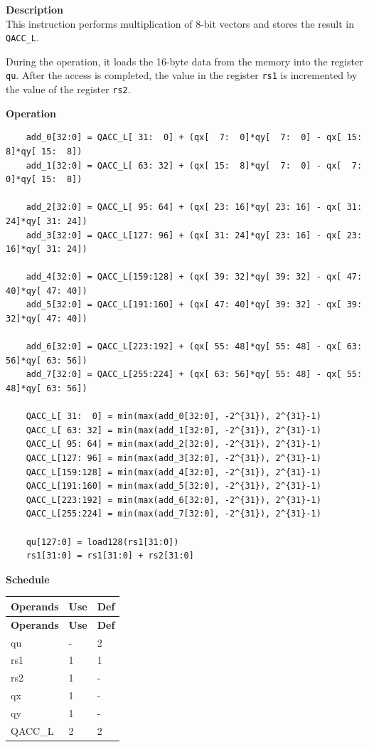 \textbf{Description}\\
This instruction performs multiplication of 8-bit vectors and stores the result in \lstinline{QACC_L}.

During the operation, it loads the 16-byte data from the memory into the register \lstinline{qu}. After the access is completed, the value in the register \lstinline{rs1} is incremented by the value of the register \lstinline{rs2}.


\textbf{Operation}\\
\begin{lstlisting}
    add_0[32:0] = QACC_L[ 31:  0] + (qx[  7:  0]*qy[  7:  0] - qx[ 15:  8]*qy[ 15:  8])
    add_1[32:0] = QACC_L[ 63: 32] + (qx[ 15:  8]*qy[  7:  0] - qx[  7:  0]*qy[ 15:  8])

    add_2[32:0] = QACC_L[ 95: 64] + (qx[ 23: 16]*qy[ 23: 16] - qx[ 31: 24]*qy[ 31: 24])
    add_3[32:0] = QACC_L[127: 96] + (qx[ 31: 24]*qy[ 23: 16] - qx[ 23: 16]*qy[ 31: 24])

    add_4[32:0] = QACC_L[159:128] + (qx[ 39: 32]*qy[ 39: 32] - qx[ 47: 40]*qy[ 47: 40])
    add_5[32:0] = QACC_L[191:160] + (qx[ 47: 40]*qy[ 39: 32] - qx[ 39: 32]*qy[ 47: 40])

    add_6[32:0] = QACC_L[223:192] + (qx[ 55: 48]*qy[ 55: 48] - qx[ 63: 56]*qy[ 63: 56])
    add_7[32:0] = QACC_L[255:224] + (qx[ 63: 56]*qy[ 55: 48] - qx[ 55: 48]*qy[ 63: 56])

    QACC_L[ 31:  0] = min(max(add_0[32:0], -2^{31}), 2^{31}-1)
    QACC_L[ 63: 32] = min(max(add_1[32:0], -2^{31}), 2^{31}-1)
    QACC_L[ 95: 64] = min(max(add_2[32:0], -2^{31}), 2^{31}-1)
    QACC_L[127: 96] = min(max(add_3[32:0], -2^{31}), 2^{31}-1)
    QACC_L[159:128] = min(max(add_4[32:0], -2^{31}), 2^{31}-1)
    QACC_L[191:160] = min(max(add_5[32:0], -2^{31}), 2^{31}-1)
    QACC_L[223:192] = min(max(add_6[32:0], -2^{31}), 2^{31}-1)
    QACC_L[255:224] = min(max(add_7[32:0], -2^{31}), 2^{31}-1)

    qu[127:0] = load128(rs1[31:0])
    rs1[31:0] = rs1[31:0] + rs2[31:0]
\end{lstlisting}

\textbf{Schedule}\\
\begin{longtable}[c]{|l|l|l|}
    \hline
    \rowcolor{lightgray}
    \textbf{Operands} & \textbf{Use} & \textbf{Def} \\\hline
    \endfirsthead
    \hline
    \rowcolor{lightgray}
     \textbf{Operands} & \textbf{Use} & \textbf{Def} \\\hline
    \endhead
    \hline
    \endfoot

    qu & - & 2 \\\hline
    rs1 & 1 & 1 \\\hline
    rs2 & 1 & - \\\hline
     qx & 1 & - \\\hline
     qy & 1 & - \\\hline
     QACC\_L & 2 & 2

\end{longtable}

